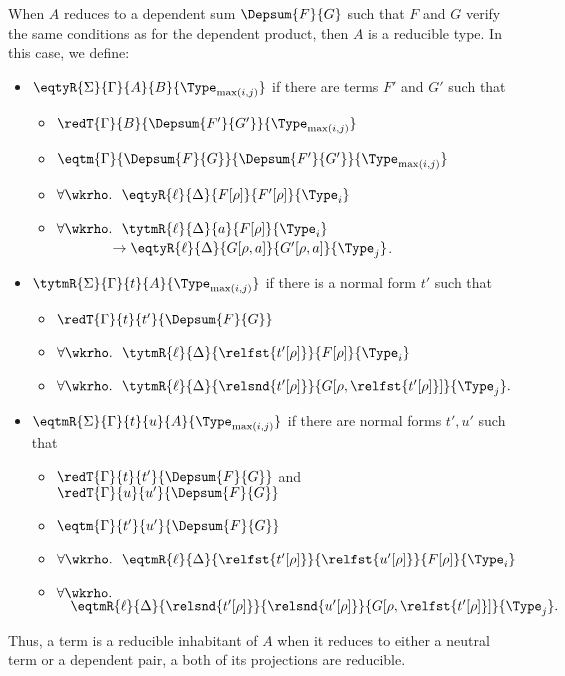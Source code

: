 When \( A \) reduces to a dependent sum \( \Depsum{F}{G} \) such that \( F \) 
and \( G \) verify the same conditions as for the dependent product, then 
\( A \) is a reducible type.
% 
In this case, we define:
\begin{itemize}
  \item \( \eqtyR{\Sigma}{\Gamma}{A}{B}{\Type_{\mathrm{max}(i,j)}} \) if there are terms \( F' \) and \( G' \) such that
    \begin{itemize}
      \item \( \redT{\Gamma}{B}{\Depsum{F'}{G'}}{\Type_{\mathrm{max}(i,j)}} \) 
      \item \( \eqtm{\Gamma}{\Depsum{F}{G}}{\Depsum{F'}{G'}}{\Type_{\mathrm{max}(i,j)}} \)
      \item \( \forall \wkrho.\ \ \eqtyR{\ell}{\Delta}{F[\rho]}{F'[\rho]}{\Type_i} \)
      \item \( \forall \wkrho.\ \ {\tytmR{\ell}{\Delta}{a}{F[\rho]}{\Type_i}} \) 
            \\ \( \phantom{\forall \wkrho} \to {\eqtyR{\ell}{\Delta}{G[\rho, a]}{G'[\rho, a]}{\Type_j}} \).
      \end{itemize}
    \item \( \tytmR{\Sigma}{\Gamma}{t}{A}{{\Type_{\mathrm{max}(i,j)}}} \) if there is a normal form \( t' \) such that
    \begin{itemize}
      \item \( \redT{\Gamma}{t}{t'}{\Depsum{F}{G}} \)
      \item \( \forall \wkrho.\ \ {\tytmR{\ell}{\Delta}{\relfst{t'[\rho]}}{F[\rho]}{\Type_i}} \) 
      \item \( \forall \wkrho.\ \ {\tytmR{\ell}{\Delta}{\relsnd{t'[\rho]}}{G[\rho, \relfst{t'[\rho]}]}{\Type_j}}. \)
    \end{itemize}
  \item \( \eqtmR{\Sigma}{\Gamma}{t}{u}{A}{\Type_{\mathrm{max}(i,j)}} \) if there are normal forms \( t', u' \) such that
    \begin{itemize}
      \item \( \redT{\Gamma}{t}{t'}{\Depsum{F}{G}} \)
      and \( \redT{\Gamma}{u}{u'}{\Depsum{F}{G}} \)
      \item \( \eqtm{\Gamma}{t'}{u'}{\Depsum{F}{G}} \)
      \item \( \forall \wkrho.\ \ {\eqtmR{\ell}{\Delta}{\relfst{t'[\rho]}}{\relfst{u'[\rho]}}{F[\rho]}{\Type_i}} \) 
      \item \( \forall \wkrho. \) \\ \({}\quad {\eqtmR{\ell}{\Delta}{\relsnd{t'[\rho]}}{\relsnd{u'[\rho]}}{G[\rho, \relfst{t'[\rho]}]}{\Type_j}}. \)
    \end{itemize}
\end{itemize}
Thus, a term is a reducible inhabitant of \( A \) when it reduces to either a 
neutral term or a dependent pair, a both of its projections are reducible.

